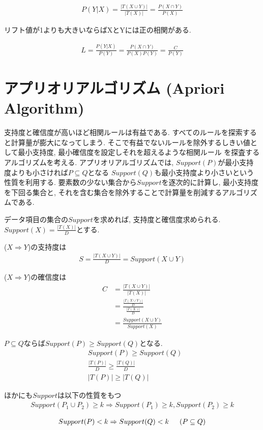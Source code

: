 \documentclass[dvipdfmx, 10pt]{jsarticle}
\begin{document}
\begin{align*}
    P(Y|X) = \frac{|T(X \cup Y)|}{|T(X)|} = \frac{P(X \cap Y)}{P(X)}
\end{align*}

リフト値が1よりも大きいならばXとYには正の相関がある. 

\begin{align*}
    L = \frac{P(Y|X)}{P(Y)} 
    = \frac{P(X \cap Y)}{P(X) P(Y)} 
    = \frac{C}{P(Y)}
\end{align*}

\section*{アプリオリアルゴリズム (Apriori Algorithm)}
支持度と確信度が高いほど相関ルールは有益である. すべてのルールを探索すると計算量が膨大になってしまう. 
そこで有益でないルールを除外するしきい値として最小支持度, 最小確信度を設定しそれを超えるような相関ルール
を探査するアルゴリズムを考える. アプリオリアルゴリズムでは, \(Support(P)\)が最小支持度よりも小さければ\(P \subseteq Q\)となる
\(Support(Q)\)も最小支持度より小さいという性質を利用する. 要素数の少ない集合から\(Support\)を逐次的に計算し, 
最小支持度を下回る集合と, それを含む集合を除外することで計算量を削減するアルゴリズムである. 

\begin{oframed}
    データ項目の集合の\(Support\)を求めれば, 支持度と確信度求められる. 
    \(Support(X) = \frac{|T(X)|}{D}\)とする. 

    (\(X \Rightarrow Y\))の支持度は
    \begin{align*}
        S = \frac{|T(X \cup Y)|}{D} = Support(X \cup Y)
    \end{align*}

    (\(X \Rightarrow Y\))の確信度は
    \begin{align*}
        C &= \frac{|T(X \cup Y)|}{|T(X)|}\\
        &= \frac{\frac{|T(X \cup Y)|}{D}}{\frac{|T(X)|}{D}}\\
        &= \frac{Support(X \cup Y)}{Support(X)}
    \end{align*}

    \(P \subseteq Q\)ならば\(Support(P) \geq Support(Q)\)となる. 
    \begin{align*}
        & Support(P) \geq Support(Q) \\
        & \frac{|T(P)|}{D} \geq \frac{|T(Q)|}{D} \\
        & |T(P)| \geq |T(Q)|
    \end{align*}

    ほかにも\(Support\)は以下の性質をもつ
    \begin{align*}
        Support(P_1 \cup P_2) \geq k
        \Rightarrow Support(P_1) \geq k, Support(P_2) \geq k
    \end{align*}

    \begin{align*}
        Support(P) < k 
        \Rightarrow Support(Q) < k \indent (P \subseteq Q)
    \end{align*}
\end{oframed}
\end{document}
